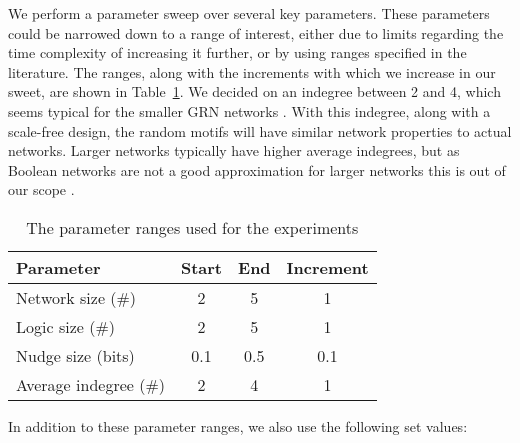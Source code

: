 \documentclass[../main.tex]{subfiles}
\begin{document}
We perform a parameter sweep over several key parameters.
These parameters could be narrowed down to a range of interest, either due to limits regarding the time complexity of increasing it further, or by using ranges specified in the literature.
The ranges, along with the increments with which we increase in our sweet, are shown in Table~\ref{parameters}.
We decided on an indegree between 2 and 4, which seems typical for the smaller GRN networks \cite{lahdesmaki2003learning}.
With this indegree, along with a scale-free design, the random motifs will have similar network properties to actual networks.
Larger networks typically have higher average indegrees, but as Boolean networks are not a good approximation for larger networks this is out of our scope \cite{lahdesmaki2003learning, karlebach2008modelling}.

\begin{center}
\begin{table}
\label{parameters}
\caption{The parameter ranges used for the experiments}
\begin{tabular}{| l | c | c | c |}
\hline
Parameter & Start & End & Increment \\
\hline
Network size (\#) & 2 & 5 & 1 \\
Logic size (\#) & 2 & 5 & 1 \\
Nudge size (bits) & 0.1 & 0.5 & 0.1 \\
Average indegree (\#) & 2 & 4 & 1 \\
\hline
\end{tabular}
\end{table}
\end{center}

In addition to these parameter ranges, we also use the following set values:

\end{document}
